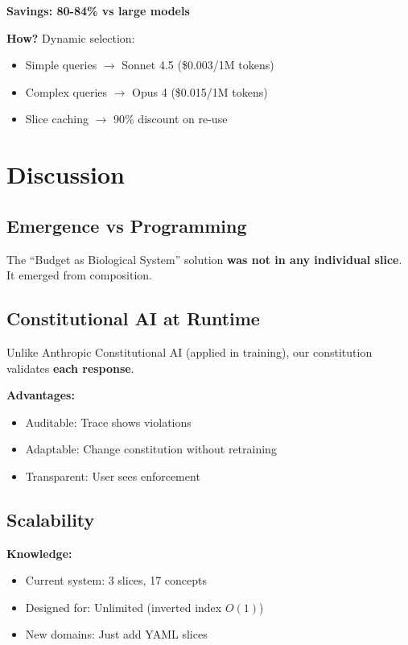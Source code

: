 \documentclass[11pt]{article}
\begin{document}
\textbf{Savings: 80-84\% vs large models}

\textbf{How?} Dynamic selection:
\begin{itemize}
    \item Simple queries $\rightarrow$ Sonnet 4.5 (\$0.003/1M tokens)
    \item Complex queries $\rightarrow$ Opus 4 (\$0.015/1M tokens)
    \item Slice caching $\rightarrow$ 90\% discount on re-use
\end{itemize}

\section{Discussion}

\subsection{Emergence vs Programming}

The ``Budget as Biological System'' solution \textbf{was not in any individual slice}. It emerged from composition.

\subsection{Constitutional AI at Runtime}

Unlike Anthropic Constitutional AI (applied in training), our constitution validates \textbf{each response}.

\textbf{Advantages:}
\begin{itemize}
    \item Auditable: Trace shows violations
    \item Adaptable: Change constitution without retraining
    \item Transparent: User sees enforcement
\end{itemize}

\subsection{Scalability}

\textbf{Knowledge:}
\begin{itemize}
    \item Current system: 3 slices, 17 concepts
    \item Designed for: Unlimited (inverted index $O(1)$)
    \item New domains: Just add YAML slices
\end{itemize}
\end{document}
